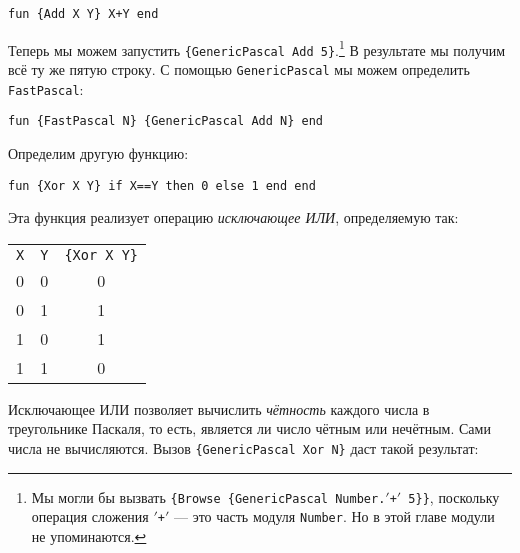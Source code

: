 \begin{lstlisting}
fun {Add X Y} X+Y end
\end{lstlisting}

\VerbatimFootnotes
Теперь мы можем запустить \lstinline|{GenericPascal Add 5}|.\footnote{Мы могли бы вызвать \verb|{Browse {GenericPascal Number.|$'$\verb|+|$'$\verb| 5}}|, поскольку операция сложения  $'$\lstinline|+|$'$ --- это часть модуля \lstinline|Number|. Но в этой главе модули не упоминаются.} В результате мы получим всё ту же пятую строку. С помощью \lstinline|GenericPascal| мы можем определить \lstinline|FastPascal|:

\begin{lstlisting}
fun {FastPascal N} {GenericPascal Add N} end
\end{lstlisting}

Определим другую функцию:

\begin{lstlisting}
fun {Xor X Y} if X==Y then 0 else 1 end end
\end{lstlisting}

Эта функция реализует операцию \emph{исключающее ИЛИ}, определяемую так:

\begin{center}
\begin{tabular}{ccc}
\lstinline|X| & \lstinline|Y| & \lstinline|{Xor X Y}| \\
0 & 0 & 0 \\
0 & 1 & 1 \\
1 & 0 & 1 \\
1 & 1 & 0 \\
\end{tabular}
\end{center}

Исключающее ИЛИ позволяет вычислить \emph{чётность} каждого числа в треугольнике Паскаля, то есть, является ли число чётным или нечётным. Сами числа не вычисляются. Вызов \lstinline|{GenericPascal Xor N}| даст такой результат:

